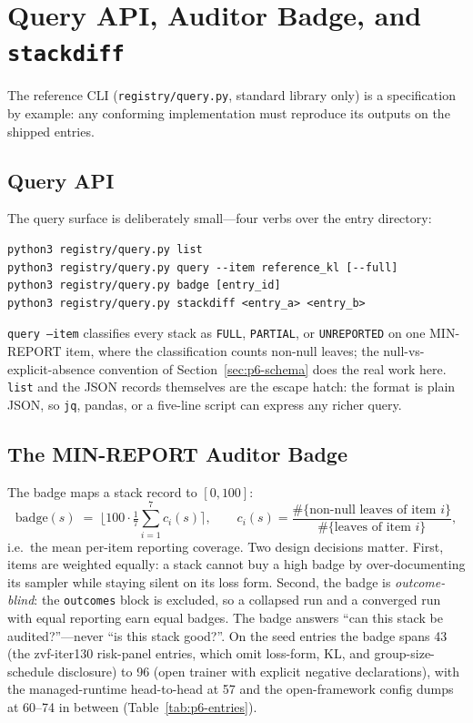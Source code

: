 \documentclass{article}
\begin{document}
 \section{Query API, Auditor Badge, and \texttt{stackdiff}}
\label{sec:p6-query}

The reference CLI (\texttt{registry/query.py}, standard library only) is a
specification by example: any conforming implementation must reproduce its
outputs on the shipped entries.

\subsection{Query API}
\label{sec:p6-query-api}
The query surface is deliberately small---four verbs over the entry
directory:

\begin{lstlisting}[basicstyle=\ttfamily\scriptsize, frame=single,
  caption={The reference CLI surface.}, label={lst:p6-cli}]
python3 registry/query.py list
python3 registry/query.py query --item reference_kl [--full]
python3 registry/query.py badge [entry_id]
python3 registry/query.py stackdiff <entry_a> <entry_b>
\end{lstlisting}

\texttt{query --item} classifies every stack as \texttt{FULL},
\texttt{PARTIAL}, or \texttt{UNREPORTED} on one MIN-REPORT item, where the
classification counts non-null leaves; the null-vs-explicit-absence convention
of Section~\ref{sec:p6-schema} does the real work here. \texttt{list} and the
JSON records themselves are the escape hatch: the format is plain JSON, so
\texttt{jq}, pandas, or a five-line script can express any richer query.

\subsection{The MIN-REPORT Auditor Badge}
\label{sec:p6-badge}
The badge maps a stack record to $[0,100]$:
\begin{equation}
  \mathrm{badge}(s) \;=\;
  \Big\lfloor 100 \cdot \tfrac{1}{7}\textstyle\sum_{i=1}^{7}
  c_i(s) \Big\rceil,
  \qquad
  c_i(s) = \frac{\#\{\text{non-null leaves of item } i\}}
                {\#\{\text{leaves of item } i\}},
  \label{eq:p6-badge}
\end{equation}
i.e.\ the mean per-item reporting coverage. Two design decisions matter.
First, items are weighted equally: a stack cannot buy a high badge by
over-documenting its sampler while staying silent on its loss form. Second,
the badge is \emph{outcome-blind}: the \texttt{outcomes} block is excluded, so
a collapsed run and a converged run with equal reporting earn equal badges.
The badge answers ``can this stack be audited?''---never ``is this stack
good?''. On the seed entries the badge spans 43 (the zvf-iter130
risk-panel entries, which omit loss-form, KL, and group-size-schedule
disclosure) to 96 (open trainer with explicit negative declarations),
with the managed-runtime head-to-head at 57 and the open-framework
config dumps at 60--74 in between (Table~\ref{tab:p6-entries}).
\end{document}
